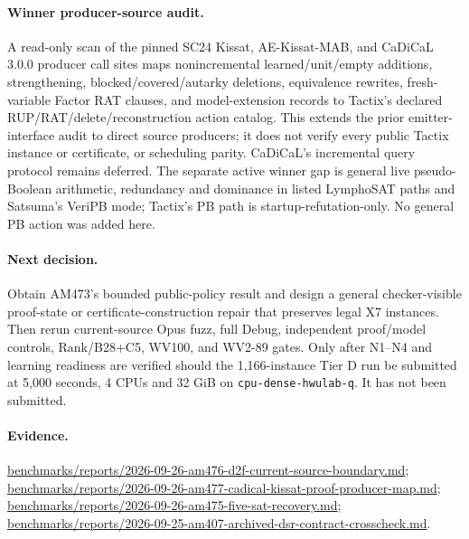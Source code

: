 \documentclass[11pt]{article}
\begin{document}
\paragraph{Winner producer-source audit.}
A read-only scan of the pinned SC24 Kissat, AE-Kissat-MAB, and CaDiCaL 3.0.0
producer call sites maps nonincremental learned/unit/empty additions,
strengthening, blocked/covered/autarky deletions, equivalence rewrites,
fresh-variable Factor RAT clauses, and model-extension records to Tactix's
declared RUP/RAT/delete/reconstruction action catalog. This extends the
prior emitter-interface audit to direct source producers; it does not verify
every public Tactix instance or certificate, or scheduling parity. CaDiCaL's
incremental query protocol remains deferred. The separate active winner
gap is general live pseudo-Boolean arithmetic, redundancy and dominance in
listed LymphoSAT paths and Satsuma's VeriPB mode; Tactix's PB path is
startup-refutation-only. No general PB action was added here.

\newpage
\paragraph{Next decision.}
Obtain AM473's bounded public-policy result and design a general checker-visible
proof-state or certificate-construction repair that preserves legal X7
instances. Then rerun current-source Opus fuzz, full Debug, independent
proof/model controls, Rank/B28+C5, WV100, and WV2-89 gates. Only after N1--N4
and learning readiness are verified should the 1,166-instance Tier D run be
submitted at 5,000 seconds, 4 CPUs and 32 GiB on
\texttt{cpu-dense-hwulab-q}. It has not been submitted.

\paragraph{Evidence.}
\url{benchmarks/reports/2026-09-26-am476-d2f-current-source-boundary.md};
\url{benchmarks/reports/2026-09-26-am477-cadical-kissat-proof-producer-map.md};
\url{benchmarks/reports/2026-09-26-am475-five-sat-recovery.md};
\url{benchmarks/reports/2026-09-25-am407-archived-dsr-contract-crosscheck.md}.
\end{document}
